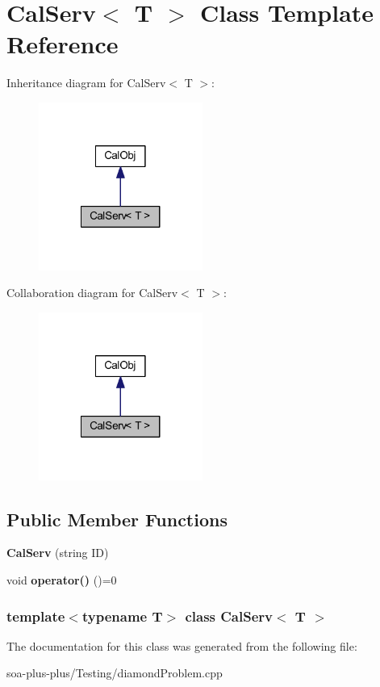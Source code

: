 \hypertarget{class_cal_serv}{
\section{CalServ$<$ T $>$ Class Template Reference}
\label{class_cal_serv}
}


Inheritance diagram for CalServ$<$ T $>$:\nopagebreak
\begin{figure}[H]
\begin{center}
\leavevmode
\includegraphics[width=152pt]{class_cal_serv__inherit__graph}
\end{center}
\end{figure}


Collaboration diagram for CalServ$<$ T $>$:\nopagebreak
\begin{figure}[H]
\begin{center}
\leavevmode
\includegraphics[width=152pt]{class_cal_serv__coll__graph}
\end{center}
\end{figure}
\subsection*{Public Member Functions}
\begin{DoxyCompactItemize}
\item 
\hypertarget{class_cal_serv_a046941817023e00958724e3396f26b28}{
{\bfseries CalServ} (string ID)}
\label{class_cal_serv_a046941817023e00958724e3396f26b28}

\item 
\hypertarget{class_cal_serv_ad242db355c74c07bdb58d8e1939ec238}{
void {\bfseries operator()} ()=0}
\label{class_cal_serv_ad242db355c74c07bdb58d8e1939ec238}

\end{DoxyCompactItemize}
\subsubsection*{template$<$typename T$>$ class CalServ$<$ T $>$}



The documentation for this class was generated from the following file:\begin{DoxyCompactItemize}
\item 
soa-\/plus-\/plus/Testing/diamondProblem.cpp\end{DoxyCompactItemize}
